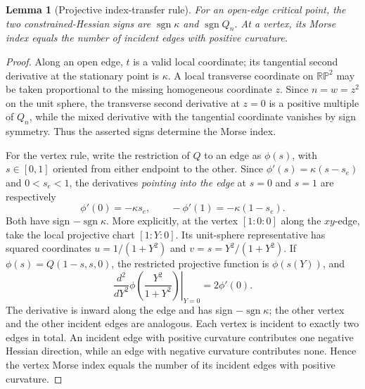 \documentclass[10pt,a4paper]{article}
\theoremstyle{plain}
\newtheorem{lemma}[theorem]{Lemma}
\theoremstyle{remark}
\newcommand{\RP}{\mathbb{RP}}
\newcommand{\sgn}{\operatorname{sgn}}
\begin{document}
\begin{lemma}[Projective index-transfer rule]\label{lem:index}
For an open-edge critical point, the two constrained-Hessian signs are $\sgn\kappa$ and $\sgn Q_n$. At a vertex, its Morse index equals the number of incident edges with positive curvature.
\end{lemma}
\begin{proof}
Along an open edge, $t$ is a valid local coordinate; its tangential second derivative at the stationary point is $\kappa$. A local transverse coordinate on $\RP^2$ may be taken proportional to the missing homogeneous coordinate $z$. Since $n=w=z^2$ on the unit sphere, the transverse second derivative at $z=0$ is a positive multiple of $Q_n$, while the mixed derivative with the tangential coordinate vanishes by sign symmetry. Thus the asserted signs determine the Morse index.

For the vertex rule, write the restriction of $Q$ to an edge as $\phi(s)$, with $s\in[0,1]$ oriented from either endpoint to the other. Since $\phi'(s)=\kappa(s-s_e)$ and $0<s_e<1$, the derivatives \emph{pointing into the edge} at $s=0$ and $s=1$ are respectively
\[
 \phi'(0)=-\kappa s_e,\qquad -\phi'(1)=-\kappa(1-s_e).
\]
Both have sign $-\sgn\kappa$. More explicitly, at the vertex $[1:0:0]$ along the $xy$-edge, take the local projective chart $[1:Y:0]$. Its unit-sphere representative has squared coordinates $u=1/(1+Y^2)$ and $v=s=Y^2/(1+Y^2)$. If $\phi(s)=Q(1-s,s,0)$, the restricted projective function is $\phi(s(Y))$, and
\[
 \left.\frac{d^2}{dY^2}\phi\!\left(\frac{Y^2}{1+Y^2}\right)\right|_{Y=0}=2\phi'(0).
\]
The derivative is inward along the edge and has sign $-\sgn\kappa$; the other vertex and the other incident edges are analogous. Each vertex is incident to exactly two edges in total. An incident edge with positive curvature contributes one negative Hessian direction, while an edge with negative curvature contributes none. Hence the vertex Morse index equals the number of its incident edges with positive curvature.
\end{proof}
\end{document}
